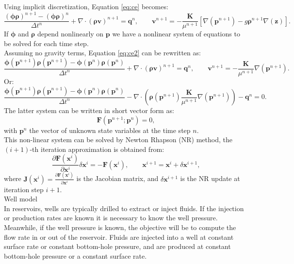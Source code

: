 \documentclass[12pt]{article}
\begin{document}
Using implicit discretization, Equation \eqref{eq:ce} becomes:
\begin{equation}\label{eq:ce2}
 \frac{(\mathbf{\phi}\mathbf{\rho})^{n+1}-(\mathbf{\phi}\mathbf{\rho})^{n}}{\Delta t^n}
 +\nabla \cdot (\mathbf{\rho} \mathbf{v})^{n+1}=\mathbf{q}^{n},
\qquad
\mathbf{v}^{n+1}= -\frac{\mathbf{K}}{\mu^{n+1}}[\nabla(\mathbf{p}^{n+1})-g\mathbf{\rho}^{n+1}\nabla(\mathbf{z})].
\end{equation}
If $\mathbf{\phi}$ and $\mathbf{\rho}$ depend nonlinearly on $\mathbf{p}$ we have a nonlinear system 
of equations to be solved for each time step.  \\
Assuming no gravity terms, Equation \eqref{eq:ce2}
can be rewritten as:
\begin{equation}\label{eq:ce3}
 \frac{\mathbf{\phi}(\mathbf{p}^{n+1})\mathbf{\rho}(\mathbf{p}^{n+1})
 -\mathbf{\phi}(\mathbf{p}^{n})\mathbf{\rho}(\mathbf{p}^{n})}{\Delta t^n}
 +\nabla \cdot (\mathbf{\rho} \mathbf{v})^{n+1}=\mathbf{q}^{n},
\qquad
\mathbf{v}^{n+1}= -\frac{\mathbf{K}}{\mu^{n+1}}\nabla(\mathbf{p}^{n+1}).
\end{equation}
Or:
\begin{equation}\label{eq:ce4}
 \frac{\mathbf{\phi}(\mathbf{p}^{n+1})\mathbf{\rho}(\mathbf{p}^{n+1})
 -\mathbf{\phi}(\mathbf{p}^{n})\mathbf{\rho}(\mathbf{p}^{n})}{\Delta t^n}
 -\nabla \cdot (\mathbf{\rho}(\mathbf{p}^{n+1}) 
 \frac{\mathbf{K}}{\mu^{n+1}}\nabla(\mathbf{p}^{n+1}))-\mathbf{q}^{n}=0.
\end{equation}
The latter system can be written in short vector form as:
\begin{equation}\label{NR}
 \mathbf{F}(\mathbf{p}^{n+1};\mathbf{p}^n)=0,
\end{equation}
with $\mathbf{p}^n$ the vector of unknown state variables at the time step $n$.\\
This non-linear system can be solved by Newton Rhapson (NR) method, the $(i+1)$-th iteration approximation is obtained from:
$$\frac{\partial \mathbf{F}(\mathbf{x}^i)}{\partial \mathbf{x}^i}\delta\mathbf{x}^i=-\mathbf{F}(\mathbf{x}^i),
\qquad \mathbf{x}^{i+1}=\mathbf{x}^i+\delta \mathbf{x}^{i+1},$$
where $\mathbf{J}(\mathbf{x}^i)=\frac{\partial \mathbf{F}(\mathbf{x}^i)}{\partial \mathbf{x}^i}$ is the 
Jacobian matrix, and $\delta \mathbf{x}^{i+1}$ is the NR update at iteration step $i+1$.\\
Well model\\
In reservoirs, wells are typically drilled to extract or inject fluids. If the injection or production rates are known it is necessary to know the well pressure. Meanwhile, if the well pressure is known, the objective will be to compute the flow rate in or out of the reservoir. Fluids are injected into a well at constant surface rate or constant bottom-hole pressure, and are produced at constant bottom-hole pressure or a constant surface rate.\\
\end{document}
